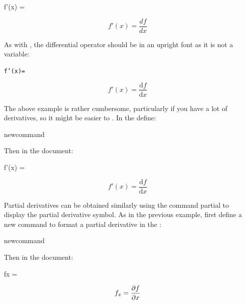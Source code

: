 \begin{codeS}
 f'(x) =  
\end{codeS}%
\begin{resultS}[Image: f'(x) = d f by d x]
\[
f'(x) = \frac{df}{dx}
\]
\end{resultS}%
As with , the differential operator  should
be in an upright font as it is not a variable:
\begin{code}
\begin{alltt}
  f'(x) = 
\end{alltt}
\end{code}%
\begin{resultS}
\[
f'(x) = \frac{\mathrm{d}f}{\mathrm{d}x}
\]
\end{resultS}

The above example is rather cumbersome, particularly
if you have a lot of derivatives, so it might be easier to
. In the 
 define:
\begin{codeS}
\gls{newcommand}
\end{codeS}%
Then in the document:
\begin{codeS}
 f'(x) =  
\end{codeS}%
\begin{resultS}
\newcommand{\deriv}[2]{\frac{\mathrm{d}#1}{\mathrm{d}#2}}

\[ f'(x) = \deriv{f}{x} \]
\end{resultS}

\label{itm:pderiv}%

Partial derivatives can be obtained similarly
using the command \gls{partial} to display the partial
derivative symbol. As in the previous example, first define a new
command to format a partial derivative in the
:
\begin{codeS}
\gls{newcommand}
\end{codeS}%
Then in the document:
\begin{codeS}
 fx =  
\end{codeS}%
\begin{resultS}[Image: f subscript x = partial d f by partial d x]
\[
f_x = \frac{\partial f}{\partial x}
\]
\end{resultS}

